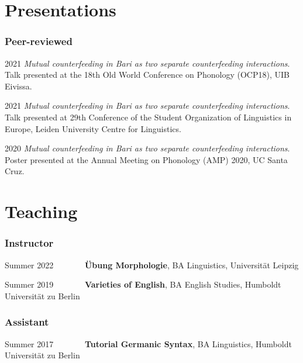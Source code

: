 \documentclass[11pt]{article}
\begin{document}

\section*{Presentations}
\vspace{-1em}
\subsubsection*{Peer-reviewed}
\begin{list}{}{
		\setlength{\leftmargin}{3.5cm}
		\setlength{\itemindent}{-2.5cm}
	}
	\item[2021\phantom{~--~03/2022/04~}] \textit{Mutual counterfeeding in Bari as two separate
		counterfeeding interactions}. Talk presented at the 18th Old World Conference on Phonology (OCP18), UIB Eivissa.

	\item[2021\phantom{~--~03/2022/04~}] \textit{Mutual counterfeeding in Bari as two separate
		counterfeeding interactions}. Talk presented at 29th Conference of the Student Organization of Linguistics in Europe, Leiden University Centre for Linguistics.
	
	\item[2020\phantom{~--~03/2022/04~}] \textit{Mutual counterfeeding in Bari as two separate counterfeeding interactions}. Poster presented at the Annual Meeting on Phonology (AMP) 2020, UC Santa Cruz.
\end{list}


\section*{Teaching}
\vspace{-1em}
\subsubsection*{Instructor}
\begin{list}{}{
		\setlength{\leftmargin}{3.5cm}
		\setlength{\itemindent}{-2.5cm}
	}
	
	\item[Summer 2022~~~~~~~] \textbf{Übung Morphologie}, BA Linguistics, Universität Leipzig
	
	\item[Summer 2019~~~~~~~] \textbf{Varieties of English}, BA English Studies, Humboldt Universität zu Berlin
\end{list}
\vspace{-1em}
\subsubsection*{Assistant}	
\begin{list}{}{
		\setlength{\leftmargin}{3.5cm}
		\setlength{\itemindent}{-2.5cm}
	}
	
	\item[Summer 2017~~~~~~~] \textbf{Tutorial Germanic Syntax}, BA Linguistics, Humboldt Universität zu Berlin
\end{list}
\end{document}
